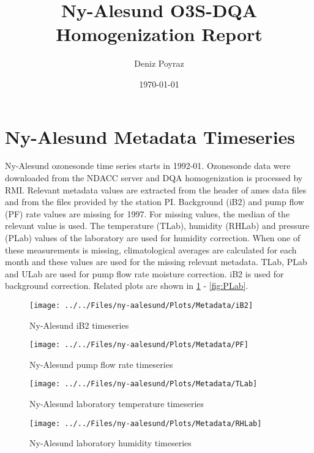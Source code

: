 \documentclass{article}
\title{Ny-Alesund O3S-DQA Homogenization Report}
\author{Deniz Poyraz}
\date{\today}
\begin{document}
\maketitle

\section{Ny-Alesund Metadata Timeseries}
\label{sec:metadata}
Ny-Alesund ozonesonde time series starts in 1992-01. Ozonesonde data were downloaded from the NDACC server and
DQA homogenization is processed by RMI. Relevant metadata values are extracted from the header of ames data files
and from the files provided by the station PI. Background (iB2) and pump flow (PF) rate values are missing for 1997.
For missing values, the median of the relevant value is used.
The temperature (TLab), humidity (RHLab) and pressure (PLab) values of the laboratory are used for humidity correction.
When one of these measurements is missing, climatological averages are calculated for each month and these values
are used for the missing relevant metadata.
TLab, PLab and ULab are used for pump flow rate moisture correction. iB2 is used for background correction.
Related plots are shown in \ref{fig:iB2} - \ref{fig:PLab}.




\begin{figure}
\centering
\texttt{[image: ../../Files/ny-aalesund/Plots/Metadata/iB2]}
\caption{Ny-Alesund iB2 timeseries}
\label{fig:iB2}
\end{figure}

\begin{figure}
\centering
\texttt{[image: ../../Files/ny-aalesund/Plots/Metadata/PF]}
\caption{Ny-Alesund pump flow rate timeseries}
\label{fig:PF}
\end{figure}



\begin{figure}
\centering
\texttt{[image: ../../Files/ny-aalesund/Plots/Metadata/TLab]}
\caption{Ny-Alesund laboratory temperature timeseries}
\label{fig:TLab}
\end{figure}

\begin{figure}
\centering
\texttt{[image: ../../Files/ny-aalesund/Plots/Metadata/RHLab]}
\caption{Ny-Alesund laboratory humidity timeseries}
\label{fig:ULab}
\end{figure}
\end{document}
